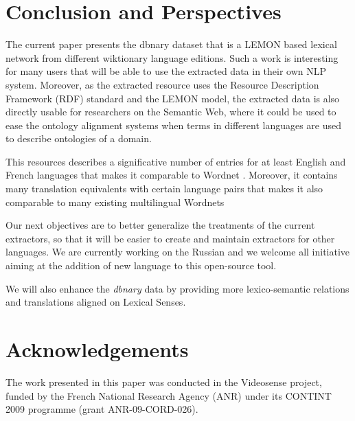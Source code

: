 \documentclass[sw]{iosart2c}
\begin{document}
\section{Conclusion and Perspectives}

The current paper presents the dbnary dataset that is a LEMON based lexical network from different wiktionary language editions. Such a work is interesting for many users that will be able to use the extracted data in their own NLP system. Moreover, as the extracted resource uses the Resource Description Framework (RDF) standard and the LEMON model, the extracted data is also directly usable for researchers on the Semantic Web, where it could be used to ease the ontology alignment systems when terms in different languages are used to describe ontologies of a domain.

This resources describes a significative number of entries for at least English and French languages that makes it comparable to Wordnet \cite{wordnet-fellbaum}. Moreover, it contains many translation equivalents with certain language pairs that makes it also comparable to many existing multilingual Wordnets

Our next objectives are to better generalize the treatments of the current extractors, so that it will be easier to create and maintain extractors for other languages. We are currently working on the Russian and we welcome all initiative aiming at the addition of new language to this open-source tool.

We will also enhance the \textit{dbnary} data by providing more lexico-semantic relations and translations aligned on Lexical Senses.

\section{Acknowledgements}

The work presented in this paper was conducted in the Videosense project, funded by the French National Research Agency (ANR) under its CONTINT 2009 programme (grant ANR-09-CORD-026).
\end{document}
